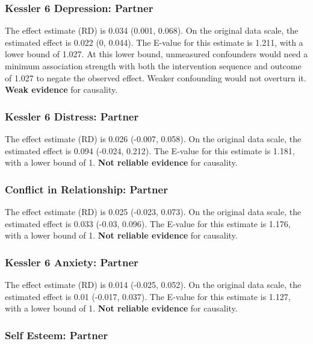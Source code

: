 \documentclass[
  singlecolumn]{article}
\begin{document}
\subsubsection{Kessler 6 Depression:
Partner}\label{kessler-6-depression-partner-1}

The effect estimate (RD) is 0.034 (0.001, 0.068). On the original data
scale, the estimated effect is 0.022 (0, 0.044). The E-value for this
estimate is 1.211, with a lower bound of 1.027. At this lower bound,
unmeasured confounders would need a minimum association strength with
both the intervention sequence and outcome of 1.027 to negate the
observed effect. Weaker confounding would not overturn it. \textbf{Weak
evidence} for causality.

\subsubsection{Kessler 6 Distress:
Partner}\label{kessler-6-distress-partner-1}

The effect estimate (RD) is 0.026 (-0.007, 0.058). On the original data
scale, the estimated effect is 0.094 (-0.024, 0.212). The E-value for
this estimate is 1.181, with a lower bound of 1. \textbf{Not reliable
evidence} for causality.

\subsubsection{Conflict in Relationship:
Partner}\label{conflict-in-relationship-partner-1}

The effect estimate (RD) is 0.025 (-0.023, 0.073). On the original data
scale, the estimated effect is 0.033 (-0.03, 0.096). The E-value for
this estimate is 1.176, with a lower bound of 1. \textbf{Not reliable
evidence} for causality.

\subsubsection{Kessler 6 Anxiety:
Partner}\label{kessler-6-anxiety-partner-1}

The effect estimate (RD) is 0.014 (-0.025, 0.052). On the original data
scale, the estimated effect is 0.01 (-0.017, 0.037). The E-value for
this estimate is 1.127, with a lower bound of 1. \textbf{Not reliable
evidence} for causality.

\subsubsection{Self Esteem: Partner}\label{self-esteem-partner-1}
\end{document}
